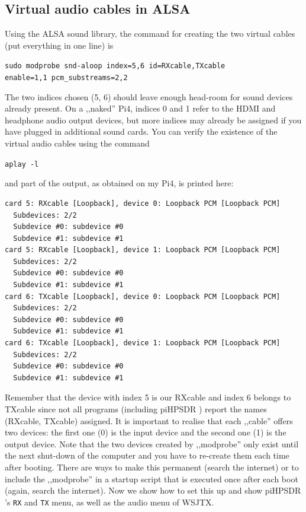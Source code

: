 \documentclass[12pt]{book}
\def\bltt#1{\texttt{\color{blue}#1}}
\def\pH{pi\-HPSDR }
\begin{document}
\subsection[ALSA: virtual audio cables]{Virtual audio cables in ALSA}
Using the ALSA sound library,
the command for creating the two virtual cables (put everything in one line) is

\texttt{sudo modprobe snd-aloop index=5,6 id=RXcable,TXcable\\
enable=1,1 pcm\_substreams=2,2}

The two indices chosen (5, 6) should leave enough head-room for sound devices
already present. On a ,,naked'' Pi4, indices 0 and 1 refer to the HDMI
and headphone audio output devices, but more indices may already be assigned
if you have plugged in additional sound cards. You can verify the existence of
the virtual audio cables using the command

\texttt{aplay -l}

and part of the output, as obtained on my Pi4, is printed here:

\begin{small}
\begin{verbatim}
card 5: RXcable [Loopback], device 0: Loopback PCM [Loopback PCM]
  Subdevices: 2/2
  Subdevice #0: subdevice #0
  Subdevice #1: subdevice #1
card 5: RXcable [Loopback], device 1: Loopback PCM [Loopback PCM]
  Subdevices: 2/2
  Subdevice #0: subdevice #0
  Subdevice #1: subdevice #1
card 6: TXcable [Loopback], device 0: Loopback PCM [Loopback PCM]
  Subdevices: 2/2
  Subdevice #0: subdevice #0
  Subdevice #1: subdevice #1
card 6: TXcable [Loopback], device 1: Loopback PCM [Loopback PCM]
  Subdevices: 2/2
  Subdevice #0: subdevice #0
  Subdevice #1: subdevice #1
\end{verbatim}
\end{small}
Remember that the device with index 5 is our RXcable and index 6 belongs to TXcable since
not all programs (including \pH) report the names (RXcable, TXcable) assigned. It is
important to realise that each ,,cable'' offers two devices: the first one (0) is
the input device and the second one (1) is the output device.
Note that
the two devices created by ,,modprobe'' only exist until the next shut-down of the computer and
you have to re-create them each time after booting. There are ways to make this permanent (search
the internet) or to include the ,,modprobe'' in a startup script that is executed once after each
boot (again, search the internet). Now we show how to set this up and show \pH's \bltt{RX} and
\bltt{TX} menu, as well as the audio menu of WSJTX.
\end{document}
